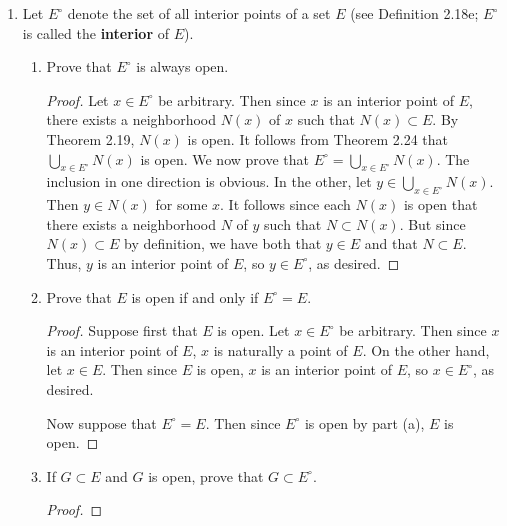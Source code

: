 \documentclass[../psets.tex]{subfiles}
\begin{document}
\begin{enumerate}[label={\textbf{\arabic*.}}]
\begin{proof}
        Taking square roots reveals that $|q-x|<r$ and $|q-x|<s$. It follows that $q\in N_r(x)\subset E$ and $q\in N_s(x)$, as desired.\par
        No, every point of every closed set $E\subset\R^2$ is not a limit point of $E$. Let $E$ be a nonempty finite set. Then by the table on \textcite[33]{bib:Rudin}, $E$ is closed but not perfect, implying that $E$ is a closed set not every point of which is a limit point of it (in fact, the fact that not every point of every closed set is a limit point of $E$ is the whole motivation for defining perfect sets!).
    \end{proof}
    \item Let $E^\circ$ denote the set of all interior points of a set $E$ (see Definition 2.18e; $E^\circ$ is called the \textbf{interior} of $E$).
    \begin{enumerate}
        \item Prove that $E^\circ$ is always open.
        \begin{proof}
            Let $x\in E^\circ$ be arbitrary. Then since $x$ is an interior point of $E$, there exists a neighborhood $N(x)$ of $x$ such that $N(x)\subset E$. By Theorem 2.19, $N(x)$ is open. It follows from Theorem 2.24 that $\bigcup_{x\in E^\circ}N(x)$ is open. We now prove that $E^\circ=\bigcup_{x\in E^\circ}N(x)$. The inclusion in one direction is obvious. In the other, let $y\in\bigcup_{x\in E^\circ}N(x)$. Then $y\in N(x)$ for some $x$. It follows since each $N(x)$ is open that there exists a neighborhood $N$ of $y$ such that $N\subset N(x)$. But since $N(x)\subset E$ by definition, we have both that $y\in E$ and that $N\subset E$. Thus, $y$ is an interior point of $E$, so $y\in E^\circ$, as desired.
        \end{proof}
        \item Prove that $E$ is open if and only if $E^\circ=E$.
        \begin{proof}
            Suppose first that $E$ is open. Let $x\in E^\circ$ be arbitrary. Then since $x$ is an interior point of $E$, $x$ is naturally a point of $E$. On the other hand, let $x\in E$. Then since $E$ is open, $x$ is an interior point of $E$, so $x\in E^\circ$, as desired.\par
            Now suppose that $E^\circ=E$. Then since $E^\circ$ is open by part (a), $E$ is open.
        \end{proof}
        \item If $G\subset E$ and $G$ is open, prove that $G\subset E^\circ$.
        \begin{proof}

\end{proof}
\end{enumerate}
\end{enumerate}
\end{document}
